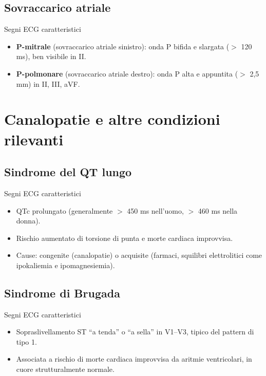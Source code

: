 \documentclass[11pt,a4paper]{article}
\begin{document}
\subsection{Sovraccarico atriale}
\begin{keybox}{Segni ECG caratteristici}
\begin{itemize}[leftmargin=1.2em]
  \item \textbf{P-mitrale} (sovraccarico atriale sinistro): onda P bifida e slargata ($>$ 120 ms), ben visibile in II.
  \item \textbf{P-polmonare} (sovraccarico atriale destro): onda P alta e appuntita ($>$ 2,5 mm) in II, III, aVF.
\end{itemize}
\end{keybox}

\section{Canalopatie e altre condizioni rilevanti}

\subsection{Sindrome del QT lungo}
\begin{keybox}{Segni ECG caratteristici}
\begin{itemize}[leftmargin=1.2em]
  \item QTc prolungato (generalmente $>$ 450 ms nell'uomo, $>$ 460 ms nella donna).
  \item Rischio aumentato di torsione di punta e morte cardiaca improvvisa.
  \item Cause: congenite (canalopatie) o acquisite (farmaci, squilibri elettrolitici come ipokaliemia e ipomagnesiemia).
\end{itemize}
\end{keybox}

\subsection{Sindrome di Brugada}
\begin{keybox}{Segni ECG caratteristici}
\begin{itemize}[leftmargin=1.2em]
  \item Sopraslivellamento ST “a tenda” o “a sella” in V1--V3, tipico del pattern di tipo 1.
  \item Associata a rischio di morte cardiaca improvvisa da aritmie ventricolari, in cuore strutturalmente normale.
\end{itemize}
\end{keybox}
\end{document}
